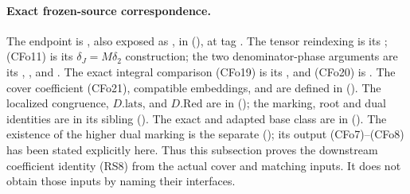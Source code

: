 \paragraph{Exact frozen-source correspondence.}
The endpoint is
, also exposed as
,
in
(),
at tag .
The tensor reindexing is its ;
(CFo11) is its \(\delta_J=M\delta_2\) construction;
the two denominator-phase arguments are its
, , 
and .
The exact integral comparison (CFo19) is its ,
and (CFo20) is .
The cover coefficient (CFo21), compatible embeddings, and
 are defined in
().
The localized congruence, \(D.\mathrm{lats}\), and \(D.\mathrm{Red}\)
are in
();
the marking, root and dual identities are in its sibling
().
The exact  and adapted base class are in
().
The existence of the higher dual marking is the separate
();
its output (CFo7)--(CFo8) has been stated explicitly here.
Thus this subsection proves the downstream coefficient identity
(RS8) from the actual cover and matching inputs. It does not
obtain those inputs by naming their interfaces.
